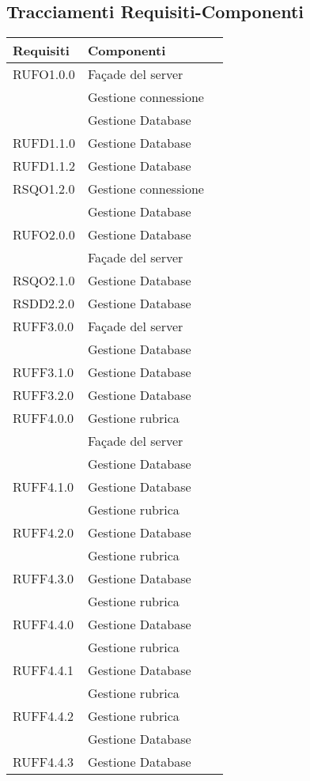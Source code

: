 \subsection{Tracciamenti Requisiti-Componenti}

\begin{center}
\begin{longtable}{lp{}l}
\toprule Requisiti &  Componenti\\
\midrule
RUFO1.0.0 & Façade del server \\
 & Gestione connessione \\
 & Gestione Database \\
RUFD1.1.0 & Gestione Database \\
RUFD1.1.2 & Gestione Database \\
RSQO1.2.0 & Gestione connessione \\
 & Gestione Database \\
RUFO2.0.0 & Gestione Database \\
 & Façade del server \\
RSQO2.1.0 & Gestione Database \\
RSDD2.2.0 & Gestione Database \\
RUFF3.0.0 & Façade del server \\
 & Gestione Database \\
RUFF3.1.0 & Gestione Database \\
RUFF3.2.0 & Gestione Database \\
RUFF4.0.0 & Gestione rubrica \\
 & Façade del server \\
 & Gestione Database \\
RUFF4.1.0 & Gestione Database \\
 & Gestione rubrica \\
RUFF4.2.0 & Gestione Database \\
 & Gestione rubrica \\
RUFF4.3.0 & Gestione Database \\
 & Gestione rubrica \\
RUFF4.4.0 & Gestione Database \\
 & Gestione rubrica \\
RUFF4.4.1 & Gestione Database \\
 & Gestione rubrica \\
RUFF4.4.2 & Gestione rubrica \\
 & Gestione Database \\
RUFF4.4.3 & Gestione Database \\

\end{longtable}
\end{center}
